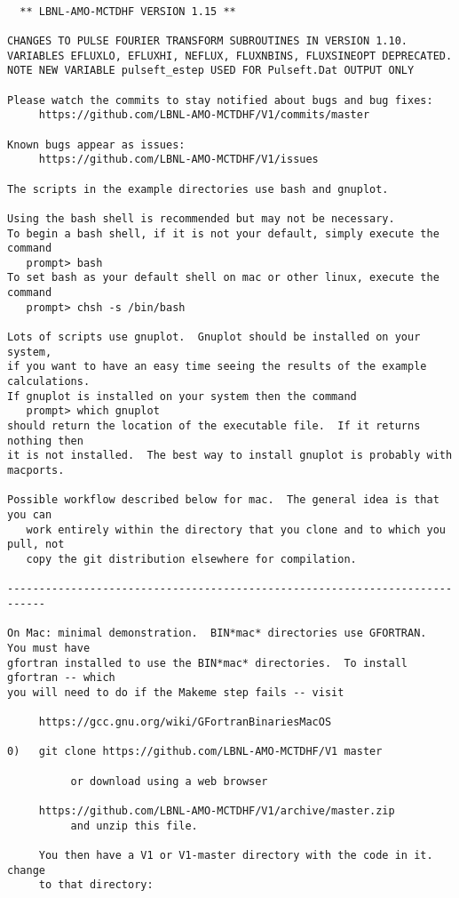 \begin{verbatim}

  ** LBNL-AMO-MCTDHF VERSION 1.15 **

CHANGES TO PULSE FOURIER TRANSFORM SUBROUTINES IN VERSION 1.10.
VARIABLES EFLUXLO, EFLUXHI, NEFLUX, FLUXNBINS, FLUXSINEOPT DEPRECATED.
NOTE NEW VARIABLE pulseft_estep USED FOR Pulseft.Dat OUTPUT ONLY

Please watch the commits to stay notified about bugs and bug fixes:
     https://github.com/LBNL-AMO-MCTDHF/V1/commits/master

Known bugs appear as issues:
     https://github.com/LBNL-AMO-MCTDHF/V1/issues

The scripts in the example directories use bash and gnuplot.  

Using the bash shell is recommended but may not be necessary.
To begin a bash shell, if it is not your default, simply execute the command
   prompt> bash
To set bash as your default shell on mac or other linux, execute the command
   prompt> chsh -s /bin/bash

Lots of scripts use gnuplot.  Gnuplot should be installed on your system,
if you want to have an easy time seeing the results of the example calculations.
If gnuplot is installed on your system then the command
   prompt> which gnuplot
should return the location of the executable file.  If it returns nothing then
it is not installed.  The best way to install gnuplot is probably with macports.

Possible workflow described below for mac.  The general idea is that you can 
   work entirely within the directory that you clone and to which you pull, not 
   copy the git distribution elsewhere for compilation.

----------------------------------------------------------------------------

On Mac: minimal demonstration.  BIN*mac* directories use GFORTRAN.  You must have
gfortran installed to use the BIN*mac* directories.  To install gfortran -- which
you will need to do if the Makeme step fails -- visit 

     https://gcc.gnu.org/wiki/GFortranBinariesMacOS

0)   git clone https://github.com/LBNL-AMO-MCTDHF/V1 master

          or download using a web browser

     https://github.com/LBNL-AMO-MCTDHF/V1/archive/master.zip
          and unzip this file.

     You then have a V1 or V1-master directory with the code in it.  change
     to that directory:


\end{verbatim}
